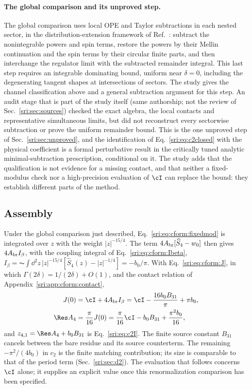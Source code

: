 \paragraph{The global comparison and its unproved step.} The global comparison uses local OPE and Taylor subtractions
in each nested sector, in the distribution-extension framework of Ref.~\cite{sri:Brunetti:2000}: subtract the
nonintegrable powers and spin terms, restore the powers by their Mellin continuation and the spin terms by their
circular finite parts, and then interchange the regulator limit with the subtracted remainder integral. This last
step requires an integrable dominating bound, uniform near $\delta=0$, including the degenerating tangent shapes at
intersections of sectors. The study gives the channel classification above and a general subtraction argument for
this step. An audit stage that is part of the study itself (same authorship; not the review of
Sec.~\ref{sri:sec:sources}) checked the exact algebra, the local contacts and representative
simultaneous limits, but did not reconstruct every sectorwise subtraction or prove the uniform remainder bound. This
is the one unproved step of Sec.~\ref{sri:sec:unproved}, and the identification of Eq.~\eqref{sri:eq:c2closed} with the
physical coefficient is a formal perturbative result in the critically tuned analytic minimal-subtraction prescription,
conditional on it. The study adds that the qualification is not evidence for a missing contact, and that neither a
fixed-modulus check nor a high-precision evaluation of $\cI$ can replace the bound: they establish different parts of
the method.

\subsection{Assembly}\label{sri:app:cform:assembly}
Under the global comparison just described, Eq.~\eqref{sri:eq:cform:fixedmod} is integrated over $z$ with the weight
$|z|^{-15/4}$. The term $4A_{\rm br}[\widehat S_4-w_0]$ then gives $4A_{\rm br}I_\beta$, with the coupling integral of
Eq.~\eqref{sri:eq:cform:Ibeta},
$I_\beta=\AC\!\int\dd^2z\,|z|^{-15/4}[\widehat S_4(z)-|z|^{-1/4}]=-b_0/\pi$. With Eq.~\eqref{sri:eq:cform:J}, in which
$\Gamma(2\delta)=1/(2\delta)+O(1)$, and the contact relation of Appendix~\ref{sri:app:cform:contact},
\begin{equation}
\begin{aligned}
 J(0)&=\cI+4A_{\rm br}I_\beta=\cI-\frac{16b_0B_{31}}{\pi}+\pi b_0,\\
 \Res A_4&=\frac\pi{16}J(0)=\frac\pi{16}\cI-b_0B_{31}+\frac{\pi^2b_0}{16},
\end{aligned}
\end{equation}
and $z_{4,1}=\Res A_4+b_0B_{31}$ is Eq.~\eqref{sri:eq:c2I}. The finite source constant $B_{31}$ cancels between the bare
residue and its source counterterm. The remaining $-\pi^2/(4b_0)$ in $c_2$ is the finite matching contribution; its
size is comparable to that of the period term (Sec.~\ref{sri:sec:d2}). The evaluation that follows concerns $\cI$ alone;
it supplies an explicit value once this renormalization comparison has been specified.

